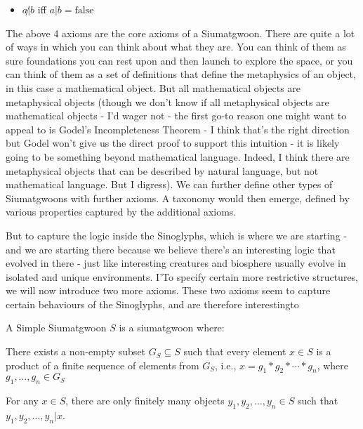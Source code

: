 \begin{itemize}
\item $a\not|b$ iff $a|b = \text{false}$
\end{itemize}

The above 4 axioms are the core axioms of a Siumatgwoon. There are quite a lot of ways in which you can think about what they are. You can think of them as sure foundations you can rest upon and then launch to explore the space, or you can think of them as a set of definitions that define the metaphysics of an object, in this case a mathematical object. But all mathematical objects are metaphysical objects (though we don't know if all metaphysical objects are mathematical objects - I'd wager not - the first go-to reason one might want to appeal to is Godel's Incompleteness Theorem - I think that's the right direction but Godel won't give us the direct proof to support this intuition - it is likely going to be something beyond mathematical language. Indeed, I think there are metaphysical objects that can be described by natural language, but not mathematical language. But I digress). We can further define other types of Siumatgwoons with further axioms. A taxonomy would then emerge, defined by various properties captured by the additional axioms.

But to capture the logic inside the Sinoglyphs, which is where we are starting - and we are starting there because we believe there's an interesting logic that evolved in there - just like interesting creatures and biosphere usually evolve in isolated and unique environments. I'To specify certain more restrictive structures, we will now introduce two more axioms. 
These two axioms seem to capture certain behaviours of the Sinoglyphs, and are therefore interestingto 


\begin{definition}\label{def:simple}
A Simple Siumatgwoon $S$ is a siumatgwoon where:
\begin{axiom}\label{ax:finite_decomposition} 
    There exists a non-empty subset $G_{S} \subseteq S$ such that every element $x \in S$ is a product of a finite sequence of elements from $G_S$, i.e., $x = g_1 * g_2 * \cdots * g_n$, where $g_1, \dots, g_n \in G_S$
    \end{axiom}
    
    \begin{axiom}\label{ax:finite_constitution} 
        For any $x \in S$, there are only finitely many objects $y_1, y_2, \ldots, y_n \in S$ such that $y_1, y_2, \ldots, y_n | x$.
    \end{axiom}
    
\end{definition}

